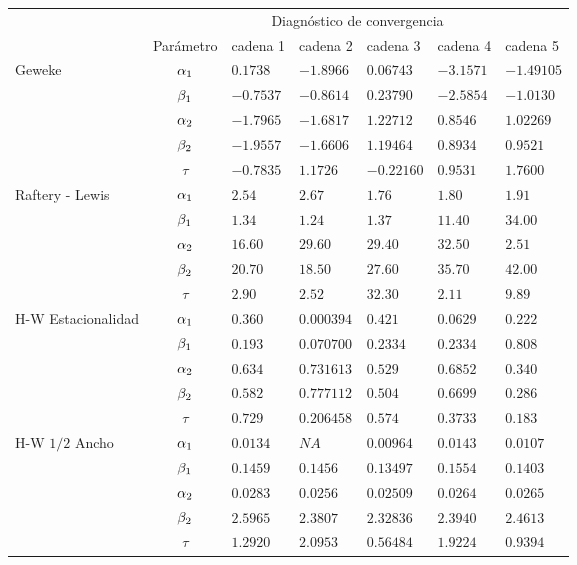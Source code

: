 \begin{table}[!h]
\centering
\begin{tabular}{|l|c|l|l|l|l|l|}
\hline
& \multicolumn{6}{|c|}{Diagnóstico de convergencia} \\
\cline{2-7}
& Parámetro & cadena 1  & cadena 2  & cadena 3 & cadena 4 & cadena 5	 \\
\hline \hline
\multirow{5}{2.5cm}{Geweke} & $\alpha_1$ & $0.1738$ & $-1.8966$ & $0.06743$ & $-3.1571$  & $-1.49105$\\ \cline{2-7}
& $\beta_1$& $-0.7537$ & $-0.8614$ & $0.23790$ & $-2.5854$ & $ -1.0130 $\\
\cline{2-7}
& $\alpha_2$& $-1.7965$ & $-1.6817$ & $1.22712$ & $0.8546$ & $1.02269$\\
\cline{2-7}
& $\beta_2$& $-1.9557$ & $-1.6606$ & $1.19464$ & $  0.8934$ & $ 0.9521$\\
\cline{2-7}
& $\tau $& $-0.7835   $ & $ 1.1726 $ & $-0.22160$ & $0.9531$ & $1.7600$\\
  \cline{1-7}
  \multirow{5}{2.5cm}{Raftery - Lewis} & $\alpha_1$ & $2.54$ & $2.67$ & $1.76  $ & $ 1.80$  & $  1.91 $\\ \cline{2-7}
& $\beta_1$& $1.34  $ & $1.24 $ & $1.37$ & $11.40$ & $34.00$\\
\cline{2-7}
& $\alpha_2$ & $ 16.60 $ & $29.60  $ & $29.40 $ & $32.50$ & $ 2.51  $\\
\cline{2-7}
& $\beta_2$& $20.70 $ & $ 18.50$  & $27.60$ & $35.70 $ & $42.00$\\
\cline{2-7}
& $\tau $& $2.90	$ & $ 2.52$ & $32.30$ & $ 2.11$ & $ 9.89$\\
  \cline{1-7}
  \multirow{5}{2.5cm}{H-W Estacionalidad} & $\alpha_1$ & $0.360$ & $0.000394 $ & $0.421$ & $0.0629$  & $0.222 $\\ \cline{2-7}
& $\beta_1$& $0.193   $ & $0.070700  $ & $0.2334$ & $0.2334$ & $0.808 $\\
\cline{2-7}
& $\alpha_2$& $0.634 $ & $0.731613$ & $0.529$ & $0.6852$ & $0.340$\\
\cline{2-7}
& $\beta_2$& $0.582 $ & $0.777112$ & $0.504$ & $ 0.6699$ & $0.286 $\\
\cline{2-7}
& $\tau$& $0.729 $ & $0.206458 $ & $0.574$ & $ 0.3733$ & $ 0.183$\\
  \cline{1-7}
  \multirow{5}{2.5cm}{H-W $1/2$ Ancho} & $\alpha_1$ & $0.0134$ & $NA $ & $0.00964$ & $0.0143 $  & $0.0107 $\\ \cline{2-7}
& $\beta_1$& $0.1459 $ & $0.1456$ & $0.13497$ & $0.1554$ & $0.1403$\\
\cline{2-7}
& $\alpha_2$& $0.0283 $ & $0.0256$ & $0.02509$ & $0.0264$ & $0.0265$\\
\cline{2-7}
& $\beta_2$& $2.5965$ & $2.3807$ & $2.32836$ & $ 2.3940$ & $2.4613$\\
\cline{2-7}
& $\tau$& $1.2920 $ & $2.0953$ & $0.56484 $ & $ 1.9224$ & $0.9394$\\
  \cline{1-7}


\end{tabular}
\end{table}
